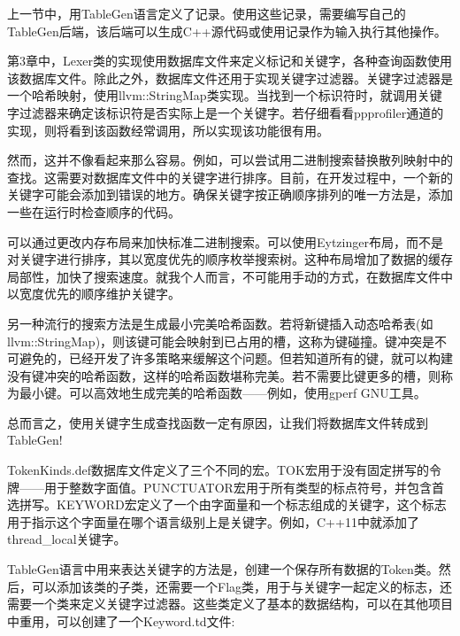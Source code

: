 
上一节中，用TableGen语言定义了记录。使用这些记录，需要编写自己的TableGen后端，该后端可以生成C++源代码或使用记录作为输入执行其他操作。

第3章中，Lexer类的实现使用数据库文件来定义标记和关键字，各种查询函数使用该数据库文件。除此之外，数据库文件还用于实现关键字过滤器。关键字过滤器是一个哈希映射，使用llvm::StringMap类实现。当找到一个标识符时，就调用关键字过滤器来确定该标识符是否实际上是一个关键字。若仔细看看ppprofiler通道的实现，则将看到该函数经常调用，所以实现该功能很有用。

然而，这并不像看起来那么容易。例如，可以尝试用二进制搜索替换散列映射中的查找。这需要对数据库文件中的关键字进行排序。目前，在开发过程中，一个新的关键字可能会添加到错误的地方。确保关键字按正确顺序排列的唯一方法是，添加一些在运行时检查顺序的代码。

可以通过更改内存布局来加快标准二进制搜索。可以使用Eytzinger布局，而不是对关键字进行排序，其以宽度优先的顺序枚举搜索树。这种布局增加了数据的缓存局部性，加快了搜索速度。就我个人而言，不可能用手动的方式，在数据库文件中以宽度优先的顺序维护关键字。

另一种流行的搜索方法是生成最小完美哈希函数。若将新键插入动态哈希表(如llvm::StringMap)，则该键可能会映射到已占用的槽，这称为键碰撞。键冲突是不可避免的，已经开发了许多策略来缓解这个问题。但若知道所有的键，就可以构建没有键冲突的哈希函数，这样的哈希函数堪称完美。若不需要比键更多的槽，则称为最小键。可以高效地生成完美的哈希函数——例如，使用gperf GNU工具。

总而言之，使用关键字生成查找函数一定有原因，让我们将数据库文件转成到TableGen!


TokenKinds.def数据库文件定义了三个不同的宏。TOK宏用于没有固定拼写的令牌——用于整数字面值。PUNCTUATOR宏用于所有类型的标点符号，并包含首选拼写。KEYWORD宏定义了一个由字面量和一个标志组成的关键字，这个标志用于指示这个字面量在哪个语言级别上是关键字。例如，C++11中就添加了thread\_local关键字。

TableGen语言中用来表达关键字的方法是，创建一个保存所有数据的Token类。然后，可以添加该类的子类，还需要一个Flag类，用于与关键字一起定义的标志，还需要一个类来定义关键字过滤器。这些类定义了基本的数据结构，可以在其他项目中重用，可以创建了一个Keyword.td文件:


